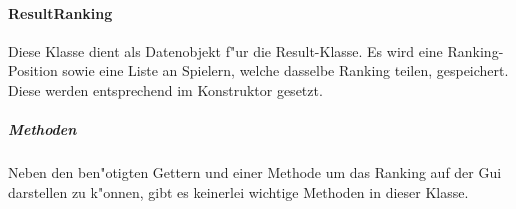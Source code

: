 \paragraph{ResultRanking}
\label{par:resultRanking}
Diese Klasse dient als Datenobjekt f"ur die Result-Klasse. Es wird eine Ranking-Position sowie eine Liste an Spielern, welche dasselbe Ranking teilen, gespeichert. Diese werden entsprechend im Konstruktor gesetzt. 

\subparagraph{Methoden}
Neben den ben"otigten Gettern und einer Methode um das Ranking auf der Gui darstellen zu k"onnen, gibt es keinerlei wichtige Methoden in dieser Klasse. 